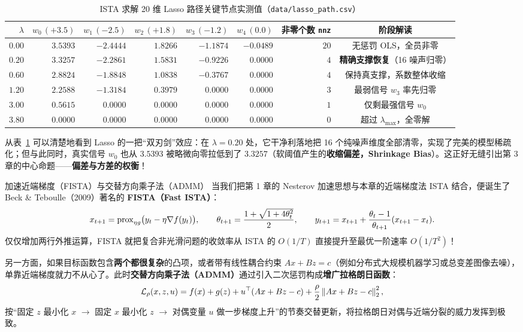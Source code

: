 \begin{table}[htbp]
\centering
\caption{ISTA 求解 20 维 Lasso 路径关键节点实测值（\texttt{data/lasso\_path.csv}）}\label{tab:v4-ch2-lasso}
\small
\begin{tabular}{@{}rrrrrrrc@{}}
\toprule
$\lambda$ & $w_0\,(+3.5)$ & $w_1\,(-2.5)$ & $w_2\,(+1.8)$ & $w_3\,(-1.2)$ & $w_4\,(0.0)$ & 非零个数 \texttt{nnz} & 阶段解读 \\
\midrule
$0.00$ & $3.5393$ & $-2.4444$ & $1.8266$ & $-1.1874$ & $-0.0489$ & $20$ & 无惩罚 OLS，全员非零 \\
$0.20$ & $3.3257$ & $-2.2861$ & $1.5831$ & $-0.9226$ & $0.0000$  & $4$  & \textbf{精确支撑恢复}（16 噪声归零） \\
$0.60$ & $2.8824$ & $-1.8848$ & $1.0838$ & $-0.3767$ & $0.0000$  & $4$  & 保持真支撑，系数整体收缩 \\
$1.20$ & $2.2588$ & $-1.3184$ & $0.3979$ & $0.0000$  & $0.0000$  & $3$  & 最弱信号 $w_3$ 率先归零 \\
$3.00$ & $0.5615$ & $0.0000$  & $0.0000$ & $0.0000$  & $0.0000$  & $1$  & 仅剩最强信号 $w_0$ \\
$3.80$ & $0.0000$ & $0.0000$  & $0.0000$ & $0.0000$  & $0.0000$  & $0$  & 超过 $\lambda_{\max}$，全零解 \\
\bottomrule
\end{tabular}
\end{table}

从表~\ref{tab:v4-ch2-lasso} 可以清楚地看到 Lasso 的一把“双刃剑”效应：在 $\lambda = 0.20$ 处，它干净利落地把 16 个纯噪声维度全部清零，实现了完美的模型稀疏化；但与此同时，真实信号 $w_0$ 也从 $3.5393$ 被略微向零拉低到了 $3.3257$（软阈值产生的\textbf{收缩偏差，Shrinkage Bias}）。这正好无缝引出第 3 章的中心命题——\textbf{偏差与方差的权衡}！

\begin{extBox}{加速近端梯度（FISTA）与交替方向乘子法（ADMM）}
当我们把第 1 章的 Nesterov 加速思想与本章的近端梯度法 ISTA 结合，便诞生了 Beck \& Teboulle（2009）著名的 \textbf{FISTA（Fast ISTA）}：
\[
  x_{t+1} = \operatorname{prox}_{\eta g}\!\big(y_t - \eta \nabla f(y_t)\big), \qquad
  \theta_{t+1} = \frac{1 + \sqrt{1 + 4\theta_t^2}}{2}, \qquad
  y_{t+1} = x_{t+1} + \frac{\theta_t - 1}{\theta_{t+1}}(x_{t+1} - x_t).
\]
仅仅增加两行外推运算，FISTA 就把复合非光滑问题的收敛率从 ISTA 的 $O(1/T)$ 直接提升至最优一阶速率 $O(1/T^2)$！

另一方面，如果目标函数包含\textbf{两个都很复杂}的凸项，或者带有线性耦合约束 $Ax + Bz = c$（例如分布式大规模机器学习或总变差图像去噪），单靠近端梯度就力不从心了。此时\textbf{交替方向乘子法（ADMM）}通过引入二次惩罚构成\textbf{增广拉格朗日函数}：
\[
  \mathcal{L}_\rho(x, z, u) = f(x) + g(z) + u^\top (Ax + Bz - c) + \frac{\rho}{2}\left\|Ax + Bz - c\right\|_2^2,
\]
按“固定 $z$ 最小化 $x$ $\to$ 固定 $x$ 最小化 $z$ $\to$ 对偶变量 $u$ 做一步梯度上升”的节奏交替更新，将拉格朗日对偶与近端分裂的威力发挥到极致。
\end{extBox}

